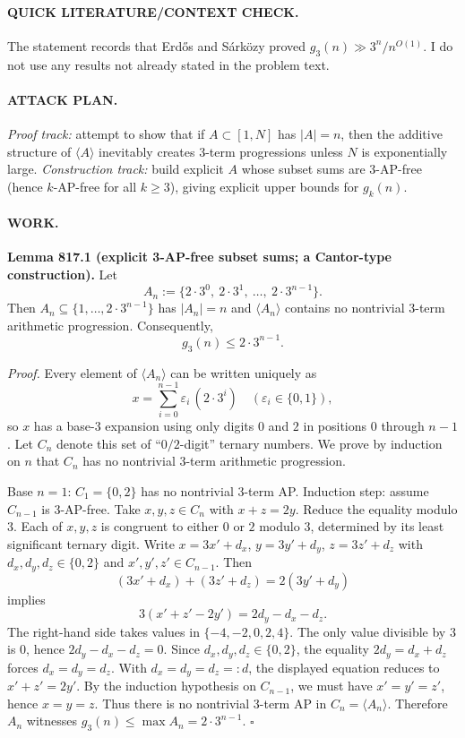 \paragraph{QUICK LITERATURE/CONTEXT CHECK.}
The statement records that Erd\H{o}s and S\'{a}rk\"{o}zy proved $g_3(n)\gg 3^n/n^{O(1)}$. I do not use any results not already stated in the problem text.

\paragraph{ATTACK PLAN.}
\emph{Proof track:} attempt to show that if $A\subset[1,N]$ has $|A|=n$, then the additive structure of $\langle A\rangle$ inevitably creates 3-term progressions unless $N$ is exponentially large.
\emph{Construction track:} build explicit $A$ whose subset sums are 3-AP-free (hence $k$-AP-free for all $k\ge3$), giving explicit upper bounds for $g_k(n)$.

\paragraph{WORK.}
\textbf{Lemma 817.1 (explicit 3-AP-free subset sums; a Cantor-type construction).}
Let
\[
A_n := \{2\cdot 3^0,\ 2\cdot 3^1,\ \dots,\ 2\cdot 3^{n-1}\}.
\]
Then $A_n\subseteq\{1,\dots,2\cdot 3^{n-1}\}$ has $|A_n|=n$ and $\langle A_n\rangle$ contains no nontrivial $3$-term arithmetic progression.
Consequently,
\[
g_3(n) \le 2\cdot 3^{n-1}.
\]

\emph{Proof.}
Every element of $\langle A_n\rangle$ can be written uniquely as
\[
x=\sum_{i=0}^{n-1}\varepsilon_i\,(2\cdot 3^i)\quad(\varepsilon_i\in\{0,1\}),
\]
so $x$ has a base-$3$ expansion using only digits $0$ and $2$ in positions $0$ through $n-1$.
Let $C_n$ denote this set of ``$0/2$-digit'' ternary numbers.
We prove by induction on $n$ that $C_n$ has no nontrivial 3-term arithmetic progression.

Base $n=1$: $C_1=\{0,2\}$ has no nontrivial 3-term AP.
Induction step: assume $C_{n-1}$ is 3-AP-free. Take $x,y,z\in C_n$ with $x+z=2y$.
Reduce the equality modulo $3$. Each of $x,y,z$ is congruent to either $0$ or $2$ modulo $3$, determined by its least significant ternary digit.
Write $x=3x'+d_x$, $y=3y'+d_y$, $z=3z'+d_z$ with $d_x,d_y,d_z\in\{0,2\}$ and $x',y',z'\in C_{n-1}$.
Then
\[
(3x'+d_x) + (3z'+d_z) = 2(3y'+d_y)
\]
implies
\[
3(x'+z'-2y') = 2d_y - d_x - d_z.
\]
The right-hand side takes values in $\{-4,-2,0,2,4\}$.
The only value divisible by $3$ is $0$, hence $2d_y-d_x-d_z=0$.
Since $d_x,d_y,d_z\in\{0,2\}$, the equality $2d_y=d_x+d_z$ forces $d_x=d_y=d_z$.
With $d_x=d_y=d_z=:d$, the displayed equation reduces to $x'+z'=2y'$.
By the induction hypothesis on $C_{n-1}$, we must have $x'=y'=z'$, hence $x=y=z$.
Thus there is no nontrivial 3-term AP in $C_n=\langle A_n\rangle$.
Therefore $A_n$ witnesses $g_3(n)\le \max A_n=2\cdot 3^{n-1}$.
\hfill $\square$


